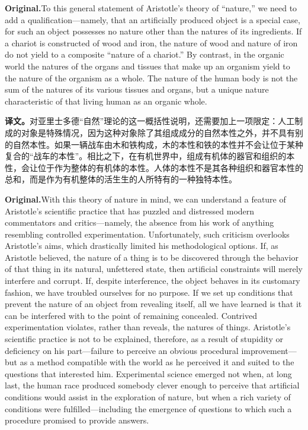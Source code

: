 \documentclass[UTF8]{ctexart}
\newcommand{\orig}{\par\noindent\textbf{Original.}\quad}
\newcommand{\zh}{\par\noindent\textbf{译文。}\quad}
\begin{document}
\orig To this general statement of Aristotle's theory of ``nature,'' we need to add a qualification---namely, that an artificially produced object is a special case, for such an object possesses no nature other than the natures of its ingredients. If a chariot is constructed of wood and iron, the nature of wood and nature of iron do not yield to a composite ``nature of a chariot.'' By contrast, in the organic world the natures of the organs and tissues that make up an organism yield to the nature of the organism as a whole. The nature of the human body is not the sum of the natures of its various tissues and organs, but a unique nature characteristic of that living human as an organic whole.

\zh 对亚里士多德“自然”理论的这一概括性说明，还需要加上一项限定：人工制成的对象是特殊情况，因为这种对象除了其组成成分的自然本性之外，并不具有别的自然本性。如果一辆战车由木和铁构成，木的本性和铁的本性并不会让位于某种复合的“战车的本性”。相比之下，在有机世界中，组成有机体的器官和组织的本性，会让位于作为整体的有机体的本性。人体的本性不是其各种组织和器官本性的总和，而是作为有机整体的活生生的人所特有的一种独特本性。

\orig With this theory of nature in mind, we can understand a feature of Aristotle's scientific practice that has puzzled and distressed modern commentators and critics---namely, the absence from his work of anything resembling controlled experimentation. Unfortunately, such criticism overlooks Aristotle's aims, which drastically limited his methodological options. If, as Aristotle believed, the nature of a thing is to be discovered through the behavior of that thing in its natural, unfettered state, then artificial constraints will merely interfere and corrupt. If, despite interference, the object behaves in its customary fashion, we have troubled ourselves for no purpose. If we set up conditions that prevent the nature of an object from revealing itself, all we have learned is that it can be interfered with to the point of remaining concealed. Contrived experimentation violates, rather than reveals, the natures of things. Aristotle's scientific practice is not to be explained, therefore, as a result of stupidity or deficiency on his part---failure to perceive an obvious procedural improvement---but as a method compatible with the world as he perceived it and suited to the questions that interested him. Experimental science emerged not when, at long last, the human race produced somebody clever enough to perceive that artificial conditions would assist in the exploration of nature, but when a rich variety of conditions were fulfilled---including the emergence of questions to which such a procedure promised to provide answers.
\end{document}
